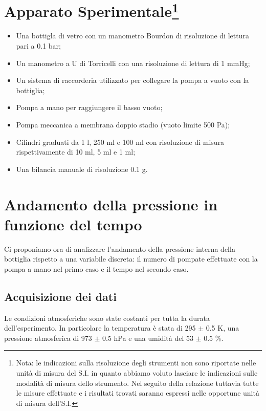 \section{Apparato Sperimentale\footnote{Nota: le indicazioni sulla risoluzione degli strumenti non sono riportate nelle unità di misura del S.I. in quanto abbiamo voluto lasciare le indicazioni sulle modalità di misura dello strumento. Nel seguito della relazione tuttavia tutte le misure effettuate e i risultati trovati saranno espressi nelle opportune unità di misura dell'S.I.}}

\begin{itemize}
	\item{Una bottigla di vetro con un manometro Bourdon di risoluzione di lettura pari a 0.1 bar;}
	\item{Un manometro a U di Torricelli con una risoluzione di lettura di 1 mmHg;}
	\item{Un sistema di raccorderia utilizzato per collegare la pompa a vuoto con la bottiglia;}
	\item{Pompa a mano per raggiungere il basso vuoto;}
	\item{Pompa meccanica a membrana doppio stadio (vuoto limite 500 Pa);}
	\item{Cilindri graduati da 1 \si{\l}, 250 \si{\ml} e 100 \si{\ml} con risoluzione di misura rispettivamente di 10 \si{\ml}, 5 \si{\ml} e 1 \si{\ml};}
	\item{Una bilancia manuale di risoluzione 0.1 g.}
\end{itemize}

\section{Andamento della pressione in funzione del tempo}

Ci proponiamo ora di analizzare l'andamento della pressione interna della bottiglia rispetto a una variabile discreta: il numero di pompate effettuate con la pompa a mano nel primo caso e il tempo nel secondo caso.

\subsection{Acquisizione dei dati}

Le condizioni atmosferiche sono state costanti per tutta la durata dell'esperimento. In particolare la temperatura è stata di 295 $\pm$ 0.5 \si{\kelvin}, una pressione atmosferica di 973 $\pm$ 0.5 hPa e una umidità del 53 $\pm$ 0.5 \%.


